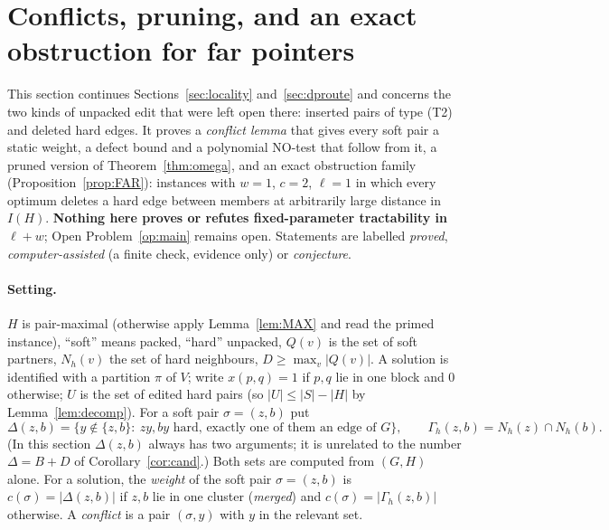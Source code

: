 \section{Conflicts, pruning, and an exact obstruction for far pointers}\label{sec:pointers}
This section continues Sections~\ref{sec:locality} and~\ref{sec:dproute} and concerns the two kinds of unpacked edit that were left open there: inserted pairs of type (T2) and deleted hard edges. It proves a \emph{conflict lemma} that gives every soft pair a static weight, a defect bound and a polynomial NO-test that follow from it, a pruned version of Theorem~\ref{thm:omega}, and an exact obstruction family (Proposition~\ref{prop:FAR}): instances with $w=1$, $c=2$, $\ell=1$ in which every optimum deletes a hard edge between members at arbitrarily large distance in $I(H)$. \textbf{Nothing here proves or refutes fixed-parameter tractability in $\ell+w$}; Open Problem~\ref{op:main} remains open. Statements are labelled \emph{proved}, \emph{computer-assisted} (a finite check, evidence only) or \emph{conjecture}.

\paragraph{Setting.}
$H$ is pair-maximal (otherwise apply Lemma~\ref{lem:MAX} and read the primed instance), ``soft'' means packed, ``hard'' unpacked, $Q(v)$ is the set of soft partners, $N_h(v)$ the set of hard neighbours, $D\ge\max_v|Q(v)|$. A solution is identified with a partition $\pi$ of $V$; write $x(p,q)=1$ if $p,q$ lie in one block and $0$ otherwise; $U$ is the set of edited hard pairs (so $|U|\le|S|-|H|$ by Lemma~\ref{lem:decomp}). For a soft pair $\sigma=(z,b)$ put
\[
\Delta(z,b)=\{y\notin\{z,b\}:\ zy,by\text{ hard, exactly one of them an edge of }G\},\qquad
\Gamma_h(z,b)=N_h(z)\cap N_h(b).
\]
(In this section $\Delta(z,b)$ always has two arguments; it is unrelated to the number $\Delta=B+D$ of Corollary~\ref{cor:cand}.) Both sets are computed from $(G,H)$ alone. For a solution, the \emph{weight} of the soft pair $\sigma=(z,b)$ is $c(\sigma)=|\Delta(z,b)|$ if $z,b$ lie in one cluster (\emph{merged}) and $c(\sigma)=|\Gamma_h(z,b)|$ otherwise. A \emph{conflict} is a pair $(\sigma,y)$ with $y$ in the relevant set.

